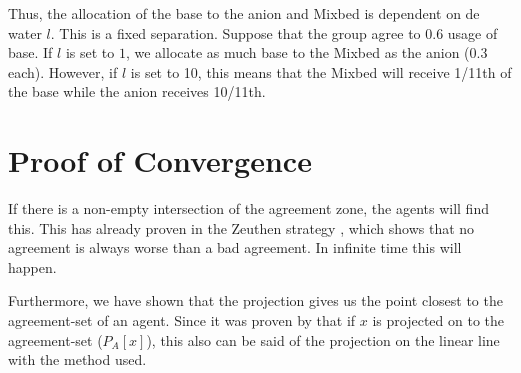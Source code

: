 Thus, the allocation of the base to the anion and Mixbed is dependent on de water $l$. This is a fixed separation. Suppose that the group agree to 0.6 usage of base. If $l$ is set to $1$, we allocate as much base to the Mixbed as the anion (0.3 each). However, if $l$ is set to 10, this means that the Mixbed will receive 1/11th of the base while the anion receives 10/11th. 

\section{Proof of Convergence}
If there is a non-empty intersection of the agreement zone, the agents will find this.
This has already proven in the Zeuthen strategy \citep{rosenschein1994rules}, which shows that no agreement is always worse than a bad agreement. In infinite time this will happen. 

Furthermore, we have shown that the projection gives us the point closest to the agreement-set of an agent. Since it was proven by \citet{zheng2015automated} that if $x$ is projected on to the agreement-set  ($P_A[x]$), this also can be said of the projection on the linear line with the method used. 

